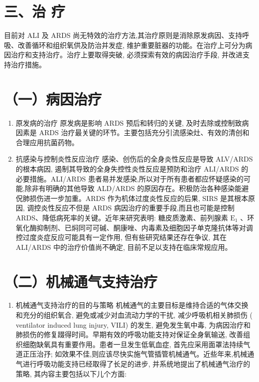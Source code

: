 \documentclass[10pt]{article}
\begin{document}
\section*{三、治 疗}
目前对 ALI 及 ARDS 尚无特效的治疗方法,其治疗原则是消除原发病因、支持呼吸、改善循环和组织氧供及防治并发症, 维护重要脏器的功能。在治疗上可分为病因治疗和支持治疗。治疗上要取得突破, 必须探索有效的病因治疗手段, 并改进支持治疗措施。

\section*{（一）病因治疗}
\begin{enumerate}
  \item 原发病的治疗 原发病是影响 ARDS 预后和转归的关键, 及时去除或控制致病因素是 ARDS 治疗最关键的环节。主要包括充分引流感染灶、有效的清创和合理应用抗菌药物。

  \item 抗感染与控制炎性反应治疗 感染、创伤后的全身炎性反应是导致 ALV/ARDS 的根本病因, 遏制其导致的全身失控性炎性反应是预防和治疗 ALI/ARDS 的必要措施。ALI/ARDS 患者易并发感染,所以对于所有患者都应怀疑感染的可能,除非有明确的其他导致 ALD/ARDS 的原因存在。积极防治各种感染能避㑆肺损伤进一步加重。ARDS 作为机体过度炎性反应的后果, SIRS 是其根本原因, 调控炎性反应不但是 ARDS 病因治疗的重要手段,而且也可能是控制 ARDS、降低病死率的关键。近年来研究表明: 糖皮质激素、前列腺素 $\mathrm{E}_{1}$ 、环氧化酶抑制剂、已焖同可可碱、酮康唑、内毒素及细胞因子单克隆抗体等对调控过度炎症反应可能具有一定作用, 但有些研究结果还存在争议, 其在 ALI/ARDS 中的治疗价值尚不确定, 目前不足以支持在临床常规应用。

\end{enumerate}

\section*{（二）机械通气支持治疗}
\begin{enumerate}
  \item 机械通气支持治疗的目的与策略 机械通气的主要目标是维持合适的气体交换和充分的组织氧合, 避免或减少对血流动力学的干扰, 减少呼吸机相关肺损伤 ( ventilator induced lung injury, VILI) 的发生, 避免发生氧中毒, 为病因治疗和肺损伤的修复䟾得时间。早期有效的呼吸功能支持对保证全身氧输送, 改善组织细胞缺氧具有重要作用。患者一旦发生低氧血症, 首先应采用面罩法持续气道正压治㜿; 如效果不佳,则应该尽快实施气管插管机械通气。近些年来,机械通气进行呼吸功能支持已经取得了长足的进步, 并系统地提出了机械通气治疗的策略, 其内容主要包括以下儿个方面:
\end{enumerate}
\end{document}
